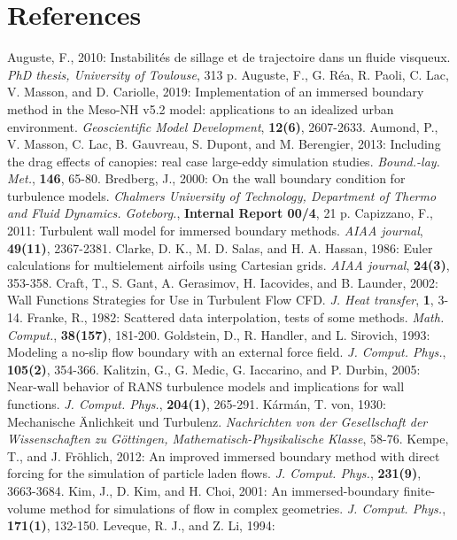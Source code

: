 \section{References}
%
\decrefname
Auguste, F., 2010:
Instabilités de sillage et de trajectoire dans un fluide visqueux.
{\it PhD thesis, University of Toulouse}, 313 p.
\decrefname
Auguste, F., G. R\'ea, R. Paoli, C. Lac, V. Masson, and D. Cariolle, 2019:
Implementation of an immersed boundary method in the Meso-NH v5.2 model: applications to an idealized urban environment.
{\it Geoscientific Model Development}, {\bf 12(6)}, 2607-2633.
\decrefname
Aumond, P., V. Masson, C. Lac, B. Gauvreau, S. Dupont, and M. Berengier, 2013:
Including the drag effects of canopies: real case large-eddy simulation studies.
{\it Bound.-lay. Met.}, {\bf 146}, 65-80.
\decrefname
Bredberg, J., 2000:
On the wall boundary condition for turbulence models.
{\it Chalmers University of Technology, Department of Thermo and Fluid Dynamics. Goteborg.}, {\bf Internal Report 00/4}, 21 p.
\decrefname
Capizzano, F., 2011:
Turbulent wall model for immersed boundary methods.
{\it AIAA journal}, {\bf 49(11)}, 2367-2381.
\decrefname
Clarke, D. K., M. D. Salas, and H. A. Hassan, 1986:
Euler calculations for multielement airfoils using Cartesian grids.
{\it AIAA journal}, {\bf 24(3)}, 353-358.
\decrefname
Craft, T., S. Gant, A. Gerasimov, H. Iacovides, and B. Launder, 2002:
Wall Functions Strategies for Use in Turbulent Flow CFD. 
{\it J. Heat transfer}, {\bf 1}, 3-14.
\decrefname
Franke, R., 1982:
Scattered data interpolation, tests of some methods.
{\it Math. Comput.}, {\bf 38(157)}, 181-200.
\decrefname
Goldstein, D., R. Handler, and L. Sirovich, 1993:
Modeling a no-slip flow boundary with an external force field.
{\it J. Comput. Phys.}, {\bf 105(2)}, 354-366.
\decrefname
Kalitzin, G., G. Medic, G. Iaccarino, and P. Durbin, 2005:
Near-wall behavior of RANS turbulence models and implications for wall functions.
{\it J. Comput. Phys.}, {\bf 204(1)}, 265-291.
\decrefname
Kármán, T. von, 1930:
Mechanische \"Anlichkeit und Turbulenz.
{\it Nachrichten von der Gesellschaft der Wissenschaften zu Göttingen, Mathematisch-Physikalische Klasse}, 58-76.
\decrefname
Kempe, T., and J. Fröhlich, 2012: 
An improved immersed boundary method with direct forcing for the simulation of particle laden flows.
{\it J. Comput. Phys.}, {\bf 231(9)}, 3663-3684.
\decrefname
Kim, J., D. Kim, and H. Choi, 2001: 
An immersed-boundary finite-volume method for simulations of flow in complex geometries.
{\it J. Comput. Phys.}, {\bf 171(1)}, 132-150.
\decrefname
Leveque, R. J., and Z. Li, 1994:
